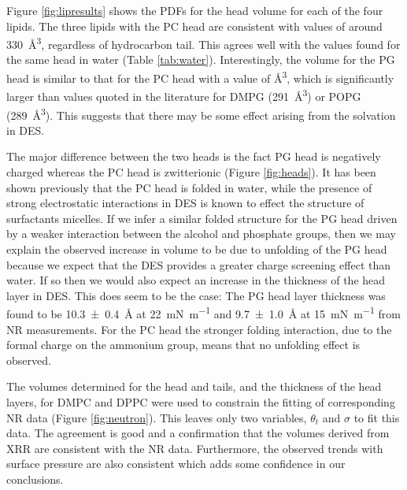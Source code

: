 \documentclass[twocolumn,a4paper]{paper}
\begin{document}
Figure \ref{fig:lipresults} shows the PDFs for the head volume for each of the four lipids.
The three lipids with the PC head are consistent with values of around \SI{330}{\cubic\angstrom}, regardless of hydrocarbon tail.
This agrees well with the values found for the same head in water (Table \ref{tab:water}).
Interestingly, the volume for the PG head is similar to that for the PC head with a value of \si{\cubic\angstrom}, which is significantly larger than values quoted in the literature for DMPG\cite{Pan2012} (\SI{291}{\cubic\angstrom}) or POPG\cite{Kucerka2012} (\SI{289}{\cubic\angstrom}).
This suggests that there may be some effect arising from the solvation in DES.

The major difference between the two heads is the fact PG head is negatively charged whereas the PC head is zwitterionic (Figure \ref{fig:heads}).
It has been shown previously that the PC head is folded in water\cite{Gilliams2016}, while the presence of strong electrostatic interactions in DES is known to effect the structure of surfactants micelles\cite{Sanchez-Fernandez2018}.
If we infer a similar folded structure for the PG head driven by a weaker interaction between the alcohol and phosphate groups, then we may explain the observed increase in volume to be due to unfolding of the PG head because we expect that the DES provides a greater charge screening effect than water.
If so then we would also expect an increase in the thickness of the head layer in DES. This does seem to be the case: The PG head layer thickness was found to be \SI[separate-uncertainty=true]{10.3\pm0.4}{\angstrom} at \SI{22}{\milli\newton\per\meter} \cite{Clifton2012} and \SI[separate-uncertainty=true]{9.7\pm1.0}{\angstrom} at \SI{15}{\milli\newton\per\meter} \cite{Ciumac2017} from NR measurements.
For the PC head the stronger folding interaction, due to the formal charge on the ammonium group, means that no unfolding effect is observed.

The volumes determined for the head and tails, and the thickness of the head layers, for DMPC and DPPC were used to constrain the fitting of corresponding NR data (Figure \ref{fig:neutron}). This leaves only two variables, $\theta_t$ and $\sigma$ to fit this data.
The agreement is good and a confirmation that the volumes derived from XRR are consistent with the NR data.
Furthermore, the observed trends with surface pressure are also consistent which adds some confidence in our conclusions.
\end{document}
